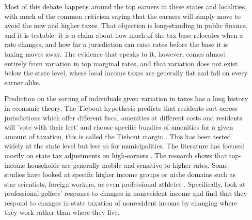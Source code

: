 \documentclass[12pt]{article}
\begin{document}
Most of this debate happens around the top earners in these states and localities, with much of the common criticism saying that the earners will simply move to avoid the new and higher taxes. That objection is long-standing in public finance, and it is testable: it is a claim about how much of the tax base relocates when a rate changes, and how far a jurisdiction can raise rates before the base it is taxing moves away. The evidence that speaks to it, however, comes almost entirely from variation in top marginal rates, and that variation does not exist below the state level, where local income taxes are generally flat and fall on every earner alike. 


Prediction on the sorting of individuals given variation in taxes has a long history in economic theory. The Tiebout hypothesis predicts that residents sort across
jurisdictions which offer different fiscal amenities at different costs and residents will 'vote with their feet' and choose specific bundles of amenities for a given amount of taxation, this is called the Tiebout margin \citep{tiebout1956}. This has been tested widely at the state level but less so for municipalities. The literature has focused mostly on state tax adjustments on high-earners
\citep{young2016, young2011, agrawalRelocationRichMigration2019}. The research shows that
top-income households are generally mobile and sensitive to higher rates. Some studies have looked at specific higher income groups or niche domains such as star scientists, foreign workers, or even professional athletes \citep{morettiEffectStateTaxes2017, kleven2020, agrawalStateTaxationNonresident2024}. Specifically, \citet{agrawalStateTaxationNonresident2024} look at professional golfers' response to changes in nonresident income and find that they respond to changes in state taxation of nonresident income by changing where they work rather than where they live.
\end{document}
